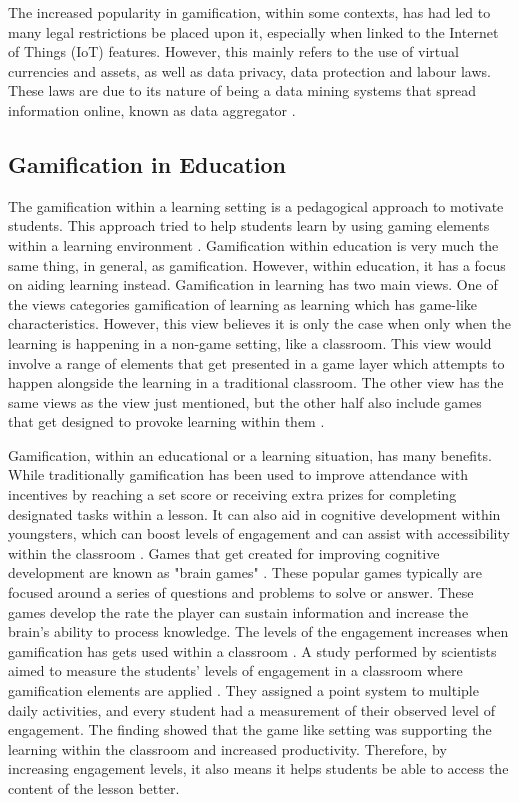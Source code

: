 	The increased popularity in gamification, within some contexts, has had led to many legal restrictions be placed upon it, especially when linked to the Internet of Things (IoT) features. However, this mainly refers to the use of virtual currencies and assets, as well as data privacy, data protection and labour laws. These laws are due to its nature of being a data mining systems that spread information online, known as data aggregator \cite{10, 11}. 
	
	
	\subsection{Gamification in Education}
	The gamification within a learning setting is a pedagogical approach to motivate students. This approach tried to help students learn by using gaming elements within a learning environment \cite{22}. Gamification within education is very much the same thing, in general, as gamification. However, within education, it has a focus on aiding learning instead. Gamification in learning has two main views. One of the views categories gamification of learning as learning which has game-like characteristics. However, this view believes it is only the case when only when the learning is happening in a non-game setting, like a classroom. This view would involve a range of elements that get presented in a  game layer which attempts to happen alongside the learning in a traditional classroom. The other view has the same views as the view just mentioned, but the other half also include games that get designed to provoke learning within them \cite{22}. 
	
	Gamification, within an educational or a learning situation, has many benefits. While traditionally gamification has been used to improve attendance with incentives by reaching a set score or receiving extra prizes for completing designated tasks within a lesson. It can also aid in cognitive development within youngsters, which can boost levels of engagement and can assist with accessibility within the classroom \cite{24}. Games that get created for improving cognitive development are known as "brain games" \cite{24}. These popular games typically are focused around a series of questions and problems to solve or answer. These games develop the rate the player can sustain information and increase the brain's ability to process knowledge. The levels of the engagement increases when gamification has gets used within a classroom \cite{25}. A study performed by scientists aimed to measure the students' levels of engagement in a classroom where gamification elements are applied \cite{25}. They assigned a point system to multiple daily activities, and every student had a measurement of their observed level of engagement. The finding showed that the game like setting was supporting the learning within the classroom and increased productivity. Therefore, by increasing engagement levels, it also means it helps students be able to access the content of the lesson better. 
	
